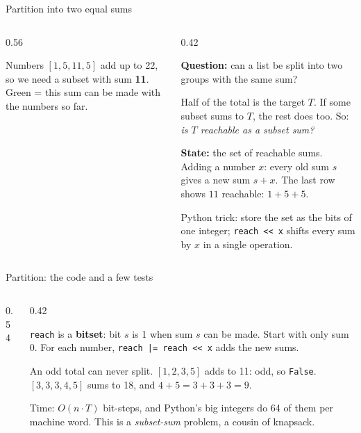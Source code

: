 \documentclass[aspectratio=169,10pt]{beamer}
\newcommand{\figtab}[2][0.5]{\begin{sfig}[#1]\end{sfig}}
\begin{document}
\begin{frame}{Partition into two equal sums}
\begin{columns}[T]
\begin{column}{0.56\textwidth}
\figtab[0.6]{fig_part}
\vspace{1mm}
{\small Numbers $[1,5,11,5]$ add up to 22, so we need a subset with sum \textbf{11}. Green = this sum can be made with the numbers so far.}
\end{column}
\begin{column}{0.42\textwidth}
{\small
\textbf{Question:} can a list be split into two groups with the same sum?

\vspace{1mm}
Half of the total is the target $T$. If some subset sums to $T$, the rest does too. So: \emph{is $T$ reachable as a subset sum?}

\vspace{1mm}
\textbf{State:} the set of reachable sums. Adding a number $x$: every old sum $s$ gives a new sum $s+x$. The last row shows $11$ reachable: $1+5+5$.

\vspace{1mm}
Python trick: store the set as the bits of one integer; \texttt{reach << x} shifts every sum by $x$ in a single operation.}
\end{column}
\end{columns}
\end{frame}

\begin{frame}{Partition: the code and a few tests}
\begin{columns}[T]
\begin{column}{0.54\textwidth}
\vspace{2mm}
\end{column}
\begin{column}{0.42\textwidth}
{\small
\texttt{reach} is a \textbf{bitset}: bit $s$ is 1 when sum $s$ can be made. Start with only sum 0. For each number, \texttt{reach |= reach << x} adds the new sums.

\vspace{2mm}
An odd total can never split. $[1,2,3,5]$ adds to 11: odd, so \texttt{False}. $[3,3,3,4,5]$ sums to 18, and $4+5=3+3+3=9$.

\vspace{2mm}
Time: $O(n\cdot T)$ bit-steps, and Python's big integers do 64 of them per machine word. This is a \emph{subset-sum} problem, a cousin of knapsack.}
\end{column}
\end{columns}
\end{frame}
\end{document}
